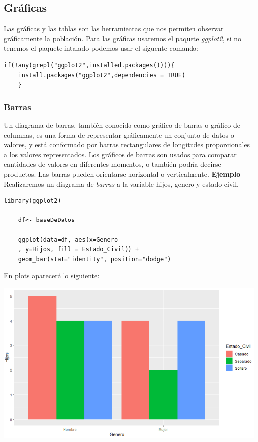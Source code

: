 \documentclass[12pt,hidelinks]{article}
\begin{document}
	\subsection{Gráficas}
	Las gráficas y las tablas son las herramientas que nos permiten observar gráficamente la población. Para las gráficas usaremos el paquete \textit{ggplot2}, si no tenemos el paquete intalado podemos usar el siguente comando:
	\begin{lstlisting}[frame=single]
	if(!any(grepl("ggplot2",installed.packages()))){
	install.packages("ggplot2",dependencies = TRUE)
	}
	\end{lstlisting}
	\subsubsection{Barras}
	Un diagrama de barras, también conocido como gráfico de barras o gráfico de columnas, es una forma de representar gráficamente un conjunto de datos o valores, y está conformado por barras rectangulares de longitudes proporcionales a los valores representados. Los gráficos de barras son usados para comparar cantidades de valores en diferentes momentos, o también podría decirse productos. Las barras pueden orientarse horizontal o verticalmente. \textbf{Ejemplo} Realizaremos un diagrama de \textit{barras} a la variable hijos, genero y estado civil.
	\begin{lstlisting}[frame=single]
	library(ggplot2)
	
	df<- baseDeDatos
	
	ggplot(data=df, aes(x=Genero
	, y=Hijos, fill = Estado_Civil)) + 
	geom_bar(stat="identity", position="dodge")
	\end{lstlisting}
	En plots aparecerá lo siguiente:
	\begin{center}
		\includegraphics[width = 14cm]{GraficaBarras.PNG}
	\end{center}
\end{document}
